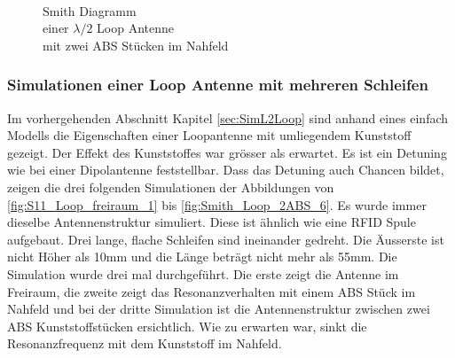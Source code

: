 \begin{figure}[!h]
\begin{center}
  	\caption{\\Smith Diagramm \\einer $\lambda/2$ Loop Antenne \\ mit zwei ABS Stücken im Nahfeld}		\label{fig:Smith_Lambda2_Loop_2ABS_6}
	\endminipage
	\end{center}
\end{figure}
\subsubsection{Simulationen einer Loop Antenne mit mehreren Schleifen}
Im vorhergehenden Abschnitt Kapitel \ref{sec:SimL2Loop} sind anhand eines einfach Modells die Eigenschaften einer Loopantenne mit umliegendem Kunststoff gezeigt. Der Effekt des Kunststoffes war grösser als erwartet. Es ist ein Detuning wie bei einer Dipolantenne feststellbar. Dass das Detuning auch Chancen bildet, zeigen die drei folgenden Simulationen der Abbildungen von \ref{fig:S11_Loop_freiraum_1} bis \ref{fig:Smith_Loop_2ABS_6}. Es wurde immer dieselbe Antennenstruktur simuliert. Diese ist ähnlich wie eine RFID Spule aufgebaut. Drei lange, flache Schleifen sind ineinander gedreht. Die Äusserste ist nicht Höher als 10mm und die Länge beträgt nicht mehr als 55mm. Die Simulation wurde drei mal durchgeführt. Die erste zeigt die Antenne im Freiraum, die zweite zeigt das Resonanzverhalten mit einem ABS Stück im Nahfeld und bei der dritte Simulation ist die Antennenstruktur zwischen zwei ABS Kunststoffstücken ersichtlich. Wie zu erwarten war, sinkt die Resonanzfrequenz mit dem Kunststoff im Nahfeld. 
